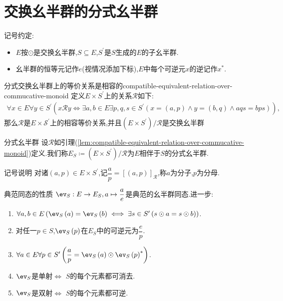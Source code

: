 \section{交换幺半群的分式幺半群}

记号约定:
\begin{itemize}
	\item $E$按$\odot$是交换幺半群,$S\subseteq E$,$S^{\prime}$是$S$生成的$E$的子幺半群.
	\item 幺半群的恒等元记作$e$(视情况添加下标),$E$中每个可逆元$x$的逆记作$x^{\ast}$.
\end{itemize}

\begin{lemma}{分式交换幺半群上的等价关系是相容的}{compatible-equivalent-relation-over-commucative-monoid}
	定义$E\times S^{\prime}$上的关系$\mathcal{R}$如下:
	\begin{align*}
		\forall x\in E\forall y\in S^{\prime}\left(x\mathcal{R}y\iff\exists a,b\in E\exists p,q,s\in S^{\prime}\left(x=\left(a,p\right)\wedge y=\left(b,q\right)\wedge aqs=bps\right)\right),
	\end{align*}
	那么$\mathcal{R}$是$E\times\mathcal{S}^{\prime}$上的相容等价关系,并且$\left(E\times S^{\prime}\right)/\mathcal{R}$是交换幺半群
\end{lemma}

\begin{definition}{分式幺半群}{}
	设$\mathcal{R}$如引理(\cref{lem:compatible-equivalent-relation-over-commucative-monoid})定义.我们称$E_{S}\coloneq\left(E\times S^{\prime}\right)/\mathcal{R}$为$E$相伴于$S$的分式幺半群.
\end{definition}

\begin{remark}{记号说明}{}
	对诸$\left(a,p\right)\in E\times S^{\prime}$,记$\dfrac{a}{p}=\left[\left(a,p\right)\right]_{\mathcal{R}}$,称$a$为分子,$p$为分母.
\end{remark}

\begin{proposition}{典范同态的性质}{}
	$\ev_{S}:E\to E_{S},a\mapsto\dfrac{a}{e}$是典范的幺半群同态.进一步:
	\begin{enumerate}
		\item$\forall a,b\in E\left(\ev_{S}\left(a\right)=\ev_{S}\left(b\right)\iff\exists s\in S^{\prime}\left(s\odot a=s\odot b\right)\right)$.
		\item 对任一$p\in S$,$\ev_{S}\left(p\right)$在$E_{S}$中的可逆元为$\dfrac{e}{p}$.
		\item $\forall a\in E\forall p\in S^{\prime}\left(\dfrac{a}{p}=\ev_{S}\left(a\right)\odot\ev_{S}\left(p\right)^{\ast}\right)$.
		\item $\ev_{S}$是单射$\iff$ $S$的每个元素都可消去.
		\item $\ev_{S}$是双射$\iff$ $S$的每个元素都可逆.
	\end{enumerate}
\end{proposition}

